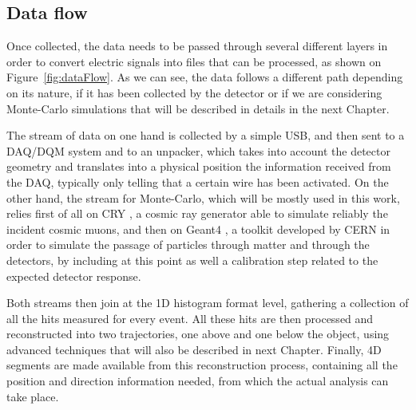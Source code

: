 \documentclass[a4paper, 11pt]{report}
\begin{document}
\subsection{Data flow} \label{sec:dataFlow}

Once collected, the data needs to be passed through several different layers in order to convert electric signals into files that can be processed, as shown on Figure~\ref{fig:dataFlow}. As we can see, the data follows a different path depending on its nature, if it has been collected by the detector or if we are considering Monte-Carlo simulations that will be described in details in the next Chapter. 

The stream of data on one hand is collected by a simple USB, and then sent to a DAQ/DQM system and to an unpacker, which takes into account the detector geometry and translates into a physical position the information received from the DAQ, typically only telling that a certain wire has been activated. On the other hand, the stream for Monte-Carlo, which will be mostly used in this work, relies first of all on CRY \cite{CRY}, a cosmic ray generator able to simulate reliably the incident cosmic muons, and then on Geant4 \cite{Geant4}, a toolkit developed by CERN in order to simulate the passage of particles through matter and through the detectors, by including at this point as well a calibration step related to the expected detector response.

Both streams then join at the 1D histogram format level, gathering a collection of all the hits measured for every event. All these hits are then processed and reconstructed into two trajectories, one above and one below the object, using advanced techniques that will also be described in next Chapter. Finally, 4D segments are made available from this reconstruction process, containing all the position and direction information needed, from which the actual analysis can take place.
\end{document}
